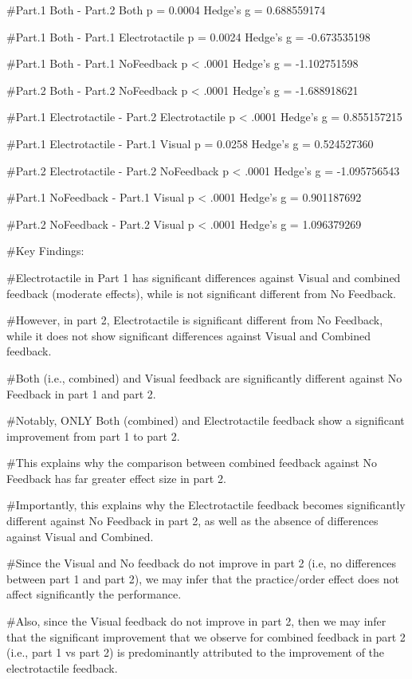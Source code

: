 \documentclass[
]{article}
\begin{document}
\#Part.1 Both - Part.2 Both p = 0.0004 Hedge's g = 0.688559174

\#Part.1 Both - Part.1 Electrotactile p = 0.0024 Hedge's g =
-0.673535198

\#Part.1 Both - Part.1 NoFeedback p \textless{} .0001 Hedge's g =
-1.102751598

\#Part.2 Both - Part.2 NoFeedback p \textless{} .0001 Hedge's g =
-1.688918621

\#Part.1 Electrotactile - Part.2 Electrotactile p \textless{} .0001
Hedge's g = 0.855157215

\#Part.1 Electrotactile - Part.1 Visual p = 0.0258 Hedge's g =
0.524527360

\#Part.2 Electrotactile - Part.2 NoFeedback p \textless{} .0001 Hedge's
g = -1.095756543

\#Part.1 NoFeedback - Part.1 Visual p \textless{} .0001 Hedge's g =
0.901187692

\#Part.2 NoFeedback - Part.2 Visual p \textless{} .0001 Hedge's g =
1.096379269

\#Key Findings:

\#Electrotactile in Part 1 has significant differences against Visual
and combined feedback (moderate effects), while is not significant
different from No Feedback.

\#However, in part 2, Electrotactile is significant different from No
Feedback, while it does not show significant differences against Visual
and Combined feedback.

\#Both (i.e., combined) and Visual feedback are significantly different
against No Feedback in part 1 and part 2.

\#Notably, ONLY Both (combined) and Electrotactile feedback show a
significant improvement from part 1 to part 2.

\#This explains why the comparison between combined feedback against No
Feedback has far greater effect size in part 2.

\#Importantly, this explains why the Electrotactile feedback becomes
significantly different against No Feedback in part 2, as well as the
absence of differences against Visual and Combined.

\#Since the Visual and No feedback do not improve in part 2 (i.e, no
differences between part 1 and part 2), we may infer that the
practice/order effect does not affect significantly the performance.

\#Also, since the Visual feedback do not improve in part 2, then we may
infer that the significant improvement that we observe for combined
feedback in part 2 (i.e., part 1 vs part 2) is predominantly attributed
to the improvement of the electrotactile feedback.
\end{document}
